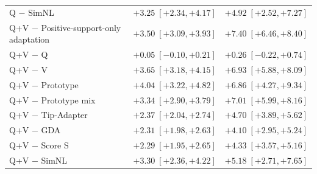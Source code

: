 \begin{table}[tp]
\begin{tabular*}{\textwidth}{@{\extracolsep{\fill}}lcc@{}}
Q $-$ SimNL & $+3.25\;[+2.34,+4.17]$ & $+4.92\;[+2.52,+7.27]$ \\
Q+V $-$ Positive-support-only adaptation & $+3.50\;[+3.09,+3.93]$ & $+7.40\;[+6.46,+8.40]$ \\
Q+V $-$ Q & $+0.05\;[-0.10,+0.21]$ & $+0.26\;[-0.22,+0.74]$ \\
Q+V $-$ V & $+3.65\;[+3.18,+4.15]$ & $+6.93\;[+5.88,+8.09]$ \\
Q+V $-$ Prototype & $+4.04\;[+3.22,+4.82]$ & $+6.86\;[+4.27,+9.34]$ \\
Q+V $-$ Prototype mix & $+3.34\;[+2.90,+3.79]$ & $+7.01\;[+5.99,+8.16]$ \\
Q+V $-$ Tip-Adapter & $+2.37\;[+2.04,+2.74]$ & $+4.70\;[+3.89,+5.62]$ \\
Q+V $-$ GDA & $+2.31\;[+1.98,+2.63]$ & $+4.10\;[+2.95,+5.24]$ \\
Q+V $-$ Score S & $+2.29\;[+1.95,+2.65]$ & $+4.33\;[+3.57,+5.16]$ \\
Q+V $-$ SimNL & $+3.30\;[+2.36,+4.22]$ & $+5.18\;[+2.71,+7.65]$ \\
\bottomrule
\end{tabular*}
\end{table}

